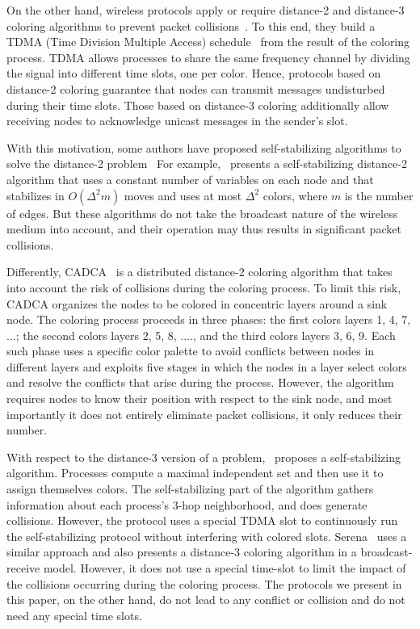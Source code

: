 \documentclass[11pt,english]{article}
\begin{document}
On the other hand, wireless protocols apply or require distance-2 and
distance-3 coloring algorithms to prevent packet
collisions~\cite{chipara11:conflict}. To this end, they build a TDMA
(Time Division Multiple Access) schedule~\cite{R97} from the result of
the coloring process.  TDMA allows processes to share the same
frequency channel by dividing the signal into different time slots,
one per color. Hence, protocols based on distance-2 coloring guarantee
that nodes can transmit messages undisturbed during their time
slots. Those based on distance-3 coloring additionally allow receiving
nodes to acknowledge unicast messages in the sender's slot.



With this motivation, some authors have proposed self-stabilizing
algorithms to solve the distance-2
problem~\cite{BM09,gairing-distanceTwo} For example,~\cite{BM09}
presents a self-stabilizing distance-2 algorithm that uses a constant
number of variables on each node and that stabilizes in $O(\Delta^2
m)$ moves and uses at most $\Delta^2$ colors, where $m$ is the number
of edges. But these algorithms do not take the broadcast nature of the
wireless medium into account, and their operation may thus results in
significant packet collisions. 

Differently, CADCA~\cite{jemili13:collision} is a distributed distance-2
coloring algorithm that takes into account the risk of collisions
during the coloring process. To limit this risk, CADCA organizes the
nodes to be colored in concentric layers around a sink node. The
coloring process proceeds in three phases: the first colors layers 1,
4, 7, ...; the second colors layers 2, 5, 8, ...., and the third
colors layers 3, 6, 9. Each such phase uses a specific color palette
to avoid conflicts between nodes in different layers and exploits five
stages in which the nodes in a layer select colors and resolve the
conflicts that arise during the process. However, the algorithm
requires nodes to know their position with respect to the sink node,
and most importantly it does not entirely eliminate packet collisions,
it only reduces their number. 


With respect to the distance-3 version of a problem,~\cite{HT04}
proposes a self-stabilizing algorithm. Processes compute a maximal
independent set and then use it to assign themselves colors. The
self-stabilizing part of the algorithm gathers information about each
process's 3-hop neighborhood, and does generate collisions. However,
the protocol uses a special TDMA slot to continuously run the
self-stabilizing protocol without interfering with colored slots.
Serena~\cite{serena} uses a similar approach and also presents a
distance-3 coloring algorithm in a broadcast-receive model. However,
it does not  use a special time-slot to limit the impact of the
collisions occurring during the coloring process.  The protocols we
present in this paper, on the other hand, do not lead to any conflict
or collision and do not need any special time slots.
\end{document}
